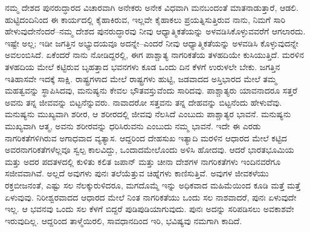 ನಮ್ಮ ದೇಶದ ಪುನರುದ್ಧಾರದ ವಿಚಾರವಾಗಿ ಅನೇಕರು ಅನೇಕ ವಿಧವಾಗಿ ಮನಬಂದಂತೆ ಮಾತನಾಡುತ್ತಾರೆ, ಆಡಲಿ. ಹುಟ್ಟಿದಂದಿನಿಂದ ಈ ಕಾರ್ಯದಲ್ಲಿ ಕೈಹಾಕಿರುವ, ಇಲ್ಲವೇ ಕೈಹಾಕಲು ಪ್ರಯತ್ನಿಸುತ್ತಿರುವ ನಾನು, ನಿಮಗೆ ಸಾರಿ ಹೇಳುವುದೇನೆಂದರೆ–ನಮ್ಮ ದೇಶದ ಪುನರುದ್ಧಾರವು ನೀವು ಆಧ್ಯಾತ್ಮಿಕತೆಯನ್ನು ಅಳವಡಿಸಿಕೊಳ್ಳುವವರೆಗೆ ಆಗಲಾರದು. ಇಷ್ಟೇ ಅಲ್ಲ; ಇಡೀ ಜಗತ್ತಿನ ಅಭ್ಯುದಯವೂ ಅದನ್ನೇ–ಎಂದರೆ ನೀವು ಆಧ್ಯಾತ್ಮಿಕತೆಯನ್ನು ಅಳವಡಿಸಿ ಕೊಳ್ಳುವುದನ್ನೇ ಅವಲಂಬಿಸಿದೆ. ಏಕೆಂದರೆ ನಾನು ನೋಡಿದ್ದರಲ್ಲಿ, ಈಗ ಪಾಶ್ಚಾತ್ಯ ನಾಗರಿಕತೆಯ ತಳಹದಿಯೇ ಕುಸಿಯುತ್ತಿದೆ. ಮರಳಿನ ತಳಹದಿಯ ಮೇಲೆ ಕಟ್ಟಿರುವ ಬೃಹತ್ತಾದ ಭವನಗಳು ಕೂಡ ಒಂದು ದಿನ ಕೆಳಗೆ ಉರುಳಲೇ ಬೇಕು. ಜಗತ್ತಿನ ಇತಿಹಾಸವೇ ಇದಕ್ಕೆ ಸಾಕ್ಷಿ. ರಾಷ್ಟ್ರಗಳಾದ ಮೇಲೆ ರಾಷ್ಟ್ರಗಳು ಹುಟ್ಟಿ, ಜಡವಾದದ ಅಸ್ತಿಭಾರದ ಮೇಲೆ ತಮ್ಮ ಮಹತ್ವವನ್ನು ಸ್ಥಾಪಿಸಿದವು, ಮನುಷ್ಯನು ಕೇವಲ ಭೌತವಸ್ತುವೆಂದು ಸಾರಿದವು. ಪಾಶ್ಚಾತ್ಯರು ಯಾವನಾದರೂ ಸತ್ತರೆ ಅವನು ತನ್ನ ಜೀವವನ್ನು ಬಿಟ್ಟನೆನ್ನುವರು. ನಾವಾದರೋ ಸತ್ತವನು ತನ್ನ ದೇಹವನ್ನು ಬಿಟ್ಟನೆಂದು ಹೇಳುವೆವು. ಮನುಷ್ಯನು ಮುಖ್ಯವಾಗಿ ಶರೀರ, ಆ ಶರೀರದಲ್ಲಿ ಜೀವವು ನೆಲಸಿದೆ ಎಂಬುದು ಪಾಶ್ಚಾತ್ಯರ ಭಾವನೆ. ಮನುಷ್ಯನು ಮುಖ್ಯವಾಗಿ ಆತ್ಮ, ಅವನು ಶರೀರವನ್ನು ಧರಿಸಿರುವನು ಎಂಬುದು ನಮ್ಮ ಭಾವನೆ. ಇದೇ ಈ ಎರಡು ನಾಗರಿಕತೆಗಳಿಗಿರುವ ಅಗಾಧವಾದ ವ್ಯತ್ಯಾಸ. ಆದ್ದರಿಂದ ದೇಹಸುಖ ಇತ್ಯಾದಿ ಮರಳಿನ ಆಧಾರದ ಮೇಲೆ ಕಟ್ಟಿದ ಅವರ\break ನಾಗರಿಕತೆಗಳೆಲ್ಲವೂ ಸ್ವಲ್ಪ ಕಾಲವಿದ್ದು, ಒಂದಾದಮೇಲೊಂದು ಅಳಿಸಿ ಹೋದವು. ಆದರೆ ಭಾರತಭೂಮಿಯ ಮತ್ತು ಅದರ ಪದತಳದಲ್ಲಿ ಕುಳಿತು ಕಲಿತ ಜಪಾನ್​ ಮತ್ತು ಚೀನಾ ದೇಶಗಳ ನಾಗರಿಕತೆಗಳು ಇಂದಿನವರೆಗೂ ಸಜೀವವಾಗಿವೆ. ಅಲ್ಲದೆ ಅವುಗಳು ಪುನಃ ತಲೆಯೆತ್ತುವ ಚಿಹ್ನೆಗಳು ಕಾಣಿಸುತ್ತಿವೆ. ಅವುಗಳ ಜೀವಕಳೆಯು ರಕ್ತಬೀಜನಂತೆ, ಎಷ್ಟು ಸಲ ನೆಲಕ್ಕುರುಳಿದರೂ, ಮಗದೊಮ್ಮೆ ಇನ್ನು ಅಧಿಕವಾದ ಮಹಿಮೆಯಿಂದ ಕೂಡಿ ಮತ್ತೆ ಮತ್ತೆ ಏಳುವುವು. ನಿರೀಶ್ವರವಾದದ ಆಧಾರದ ಮೇಲೆ ನಿಂತ ನಾಗರಿಕತೆಯು ಒಂದು ಸಲ ನಾಶವಾದರೆ, ಪುನಃ ಏಳುವುದೇ ಇಲ್ಲ. ಆ ಭವನವು ಒಂದು ಸಲ ಕೆಳಗೆ ಬಿದ್ದರೆ ಪುಡಿಪುಡಿಯಾಗುವುದು. ಪುನಃ ಅದನ್ನು ಸರಿಪಡಿಸಲು ಅವಕಾಶವೇ ಇರುವುದಿಲ್ಲ. ಆದ್ದರಿಂದ ತಾಳ್ಮೆಯಿರಲಿ, ಸಾವಧಾನದಿಂದ ಇರಿ, ಭವಿಷ್ಯವು ನಮಗಾಗಿ ಕಾದಿದೆ.

